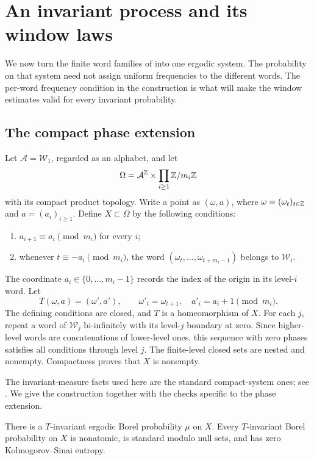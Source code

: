 \section{An invariant process and its window laws}\label{sec:process}

We now turn the finite word families of  into one
ergodic system. The probability on that system need not assign
uniform frequencies to the different words. The per-word frequency
condition in the construction is what will make the window estimates
valid for every invariant probability.

\subsection{The compact phase extension}

Let $\mathcal A=\mathcal W_1$, regarded as an alphabet, and let
\[
 \Omega=\mathcal A^{\mathbb Z}\times\prod_{i\ge1}\mathbb Z/m_i\mathbb Z
\]
with its compact product topology. Write a point as $(\omega,a)$,
where $\omega=(\omega_t)_{t\in\mathbb Z}$ and
$a=(a_i)_{i\ge1}$. Define $X\subset\Omega$ by the following conditions:
\begin{enumerate}[label=(\roman*)]
\item $a_{i+1}\equiv a_i\pmod{m_i}$ for every $i$;
\item whenever $t\equiv-a_i\pmod{m_i}$, the word
$(\omega_t,\ldots,\omega_{t+m_i-1})$ belongs to $\mathcal W_i$.
\end{enumerate}
The coordinate $a_i\in\{0,\ldots,m_i-1\}$ records the index of the
origin in its level-$i$ word. Let
\[
 T(\omega,a)=(\omega',a'),\qquad
 \omega'_t=\omega_{t+1},\quad a'_i=a_i+1\pmod{m_i}.
\]
The defining conditions are closed, and $T$ is a homeomorphism of $X$.
For each $j$, repeat a word of $\mathcal W_j$ bi-infinitely with its
level-$j$ boundary at zero. Since higher-level words are concatenations
of lower-level ones, this sequence with zero phases satisfies all
conditions through level $j$. The finite-level closed sets are nested
and nonempty. Compactness proves that $X$ is nonempty.

The invariant-measure facts used here are the standard compact-system
ones; see \cite[Theorems~6.1.4--6.1.6]{DajaniDirksin2008}.
We give the construction together with the checks specific to the
phase extension.

\begin{proposition}\label{prop:system}
There is a $T$-invariant ergodic Borel probability $\mu$ on $X$.
Every $T$-invariant Borel probability on $X$ is nonatomic, is standard
modulo null sets, and has zero Kolmogorov--Sinai entropy.
\end{proposition}

